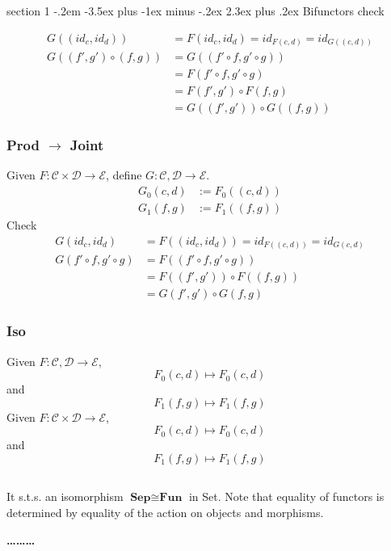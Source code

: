 \documentclass[12pt]{article}
\makeatletter
\theoremstyle{definition}
\newenvironment{problem}{\@startsection
       {section}
       {1}
       {-.2em}
       {-3.5ex plus -1ex minus -.2ex}
       {2.3ex plus .2ex}
       {\pagebreak[3]%
       \large\bf\noindent{Problem }
       }
       }
       {%
       \begin{center}\large\bf \ldots\ldots\ldots\end{center}}
\newcommand{\cat}{\mathcal}
\makeatother
\begin{document}
\begin{problem}{Bifunctors}
check 

\begin{align*}
    G((id_c,id_d)) &= F(id_c,id_d) = id_{F(c,d)} = id_{G((c,d))}\\
    G((f' ,g') \circ (f, g)) &= G((f' \circ f,g' \circ g))\\
    &=F(f' \circ f, g' \circ g)\\
    &=F(f',g') \circ F(f,g)\\
    &=G((f',g')) \circ G((f,g))
\end{align*}

\subsubsection*{Prod $\to$ Joint}
Given $F : \cat C \times \cat D \to \cat E$, define $G : \cat C ,\cat D \to \cat E$.
\begin{align*}
    G_0(c,d) &:= F_0((c,d))\\
    G_1(f,g) &:= F_1((f,g)) 
\end{align*}
Check
\begin{align*}
 G(id_c,id_d) &= F((id_c,id_d)) = id_{F((c,d))} = id_{G(c,d)} \\
 G(f' \circ f, g' \circ g) &= F((f' \circ f,g' \circ g))\\
 &=F((f',g')) \circ F((f,g)) \\
 &=G(f',g') \circ G(f,g)
\end{align*}

\subsubsection*{Iso}
Given $F : \cat C, \cat D \to \cat E$,
\[
    F_0(c,d) \mapsto F_0(c,d)
\]
and 
\[
    F_1(f,g) \mapsto F_1(f,g)   
\]
Given $F : \cat C \times \cat D \to \cat E$,
\[
    F_0(c,d) \mapsto F_0(c,d)    
\]
and 
\[
    F_1(f,g) \mapsto F_1(f,g)    
\]

\subsection{}
It s.t.s. an isomorphism $\textbf{Sep} \cong \textbf{Fun}$ in Set. Note that equality of functors is determined by equality of the action on objects and morphisms.


\end{problem}
\end{document}
